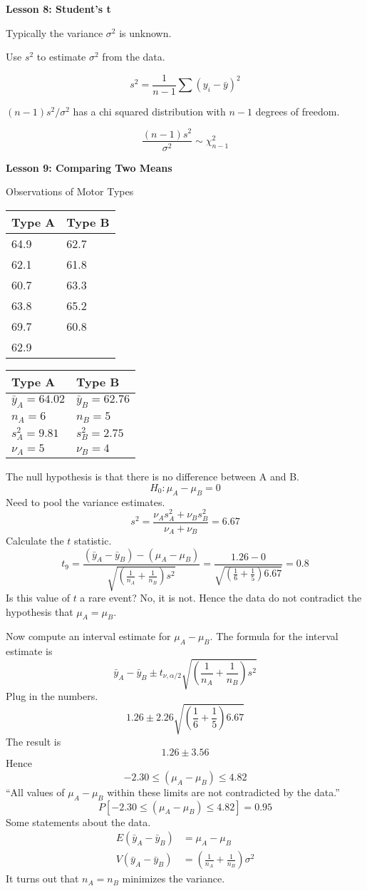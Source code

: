 \documentclass[12pt]{article}
\begin{document}
{\bf Lesson 8: Student's t}

Typically the variance $\sigma^2$ is unknown.

Use $s^2$ to estimate $\sigma^2$ from the data.

$$s^2=\frac{1}{n-1}\sum(y_i-\bar y)^2$$

$(n-1)s^2/\sigma^2$ has a chi squared distribution with $n-1$
degrees of freedom.

$$\frac{(n-1)s^2}{\sigma^2}\sim\chi^2_{n-1}$$

{\bf Lesson 9: Comparing Two Means}

\begin{center}
Observations of Motor Types

\begin{tabular}{ll}
Type A & Type B\\
\hline
64.9 & 62.7\\
62.1 & 61.8\\
60.7 & 63.3\\
63.8 & 65.2\\
69.7 & 60.8\\
62.9 &
\end{tabular}

\begin{tabular}{ll}
Type A & Type B\\
\hline
$\bar y_A=64.02$ & $\bar y_B=62.76$\\
$n_A=6$ & $n_B=5$\\
$s_A^2=9.81$ & $s_B^2=2.75$\\
$\nu_A=5$ & $\nu_B=4$
\end{tabular}
\end{center}

The null hypothesis is that there is no difference between A and B.
\[
H_0:\mu_A-\mu_B=0
\]
Need to pool the variance estimates.
$$s^2=\frac{\nu_As^2_A+\nu_Bs^2_B}{\nu_A+\nu_B}=6.67$$
Calculate the $t$ statistic.
$$t_9=\frac{(\bar y_A-\bar y_B) - (\mu_A-\mu_B)}
{\sqrt{\left(\frac{1}{n_A}+\frac{1}{n_B}\right)s^2}}
=\frac{1.26-0}
{\sqrt{\left(\frac{1}{6}+\frac{1}{5}\right)6.67}}
=0.8$$
Is this value of $t$ a rare event?
No, it is not.
Hence the data do not contradict the hypothesis that $\mu_A=\mu_B$.

Now compute an interval estimate for $\mu_A-\mu_B$.
The formula for the interval estimate is
$$\bar y_A-\bar y_B\pm t_{\nu,\alpha/2}
\sqrt{\left(\frac{1}{n_A}+\frac{1}{n_B}\right)s^2}$$
Plug in the numbers.
$$1.26\pm2.26{\sqrt{\left(\frac{1}{6}+\frac{1}{5}\right)6.67}}$$
The result is
$$1.26\pm3.56$$
Hence
$$-2.30\le(\mu_A-\mu_B)\le4.82$$
``All values of $\mu_A-\mu_B$ within these limits are not contradicted by the
data.''
$$P[-2.30\le(\mu_A-\mu_B)\le4.82]=0.95$$
Some statements about the data.
\begin{align*}
E(\bar y_A-\bar y_B)&=\mu_A-\mu_B\\
V(\bar y_A-\bar y_B)&=\left(\frac{1}{n_A}+\frac{1}{n_B}\right)\sigma^2
\end{align*}
It turns out that $n_A=n_B$ minimizes the variance.
\end{document}
